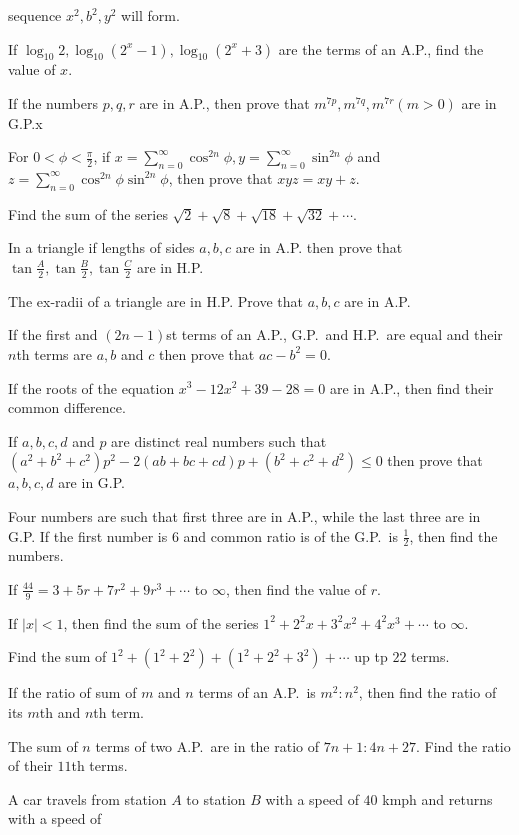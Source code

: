   sequence $x^2, b^2, y^2$ will form.
\item If $\log_{10}2, \log_{10}(2^x - 1), \log_{10}(2^x + 3)$ are the terms of an A.P., find the value of
  $x$.
\item If the numbers $p, q, r$ are in A.P., then prove that $m^{7p}, m^{7q}, m^{7r}(m > 0)$ are in G.P.x
\item For $0< \phi < \frac{\pi}{2}$, if $x = \displaystyle\sum_{n = 0}^\infty \cos^{2n}\phi, y = \sum_{n =
  0}^\infty\sin^{2n}\phi$ and $z = \displaystyle\sum_{n = 0}^\infty\cos^{2n}\phi\sin^{2n}\phi$, then prove
  that $xyz = xy + z$.
\item Find the sum of the series $\sqrt{2} + \sqrt{8} + \sqrt{18} + \sqrt{32} + \cdots$.
\item In a triangle if lengths of sides $a, b, c$ are in A.P. then prove that
  $\tan\frac{A}{2}, \tan\frac{B}{2}, \tan\frac{C}{2}$ are in H.P.
\item The ex-radii of a triangle are in H.P. Prove that $a, b, c$ are in A.P.
\item If the first and $(2n - 1)$st terms of an A.P., G.P.\ and H.P.\ are equal and their $n$th terms are
  $a, b$ and $c$ then prove that $ac - b^2 = 0$.
\item If the roots of the equation $x^3 - 12x^2 + 39 - 28 = 0$ are in A.P., then find their common
  difference.
\item If $a, b, c, d$ and $p$ are distinct real numbers such that $(a^2 + b^2 + c^2)p^2 - 2(ab + bc + cd)p +
  (b^2 + c^2 + d^2)\leq 0$ then prove that $a, b, c, d$ are in G.P.
\item Four numbers are such that first three are in A.P., while the last three are in G.P. If the first
  number is $6$ and common ratio is of the G.P.\ is $\frac{1}{2}$, then find the numbers.
\item If $\frac{44}{9} = 3 + 5r + 7r^2 + 9r^3 + \cdots$ to $\infty$, then find the value of $r$.
\item If $|x| < 1$, then find the sum of the series $1^2 + 2^2x + 3^2x^2 + 4^2x^3 + \cdots$ to $\infty$.
\item Find the sum of $1^2 + (1^2 + 2^2) + (1^2 + 2^2 + 3^2) + \cdots$ up tp $22$ terms.
\item If the ratio of sum of $m$ and $n$ terms of an A.P.\ is $m^2:n^2$, then find the ratio of its $m$th
  and $n$th term.
\item The sum of $n$ terms of two A.P.\ are in the ratio of $7n + 1:4n + 27$. Find the ratio of their $11$th
  terms.
\item A car travels from station $A$ to station $B$ with a speed of $40$ kmph and returns with a speed of
